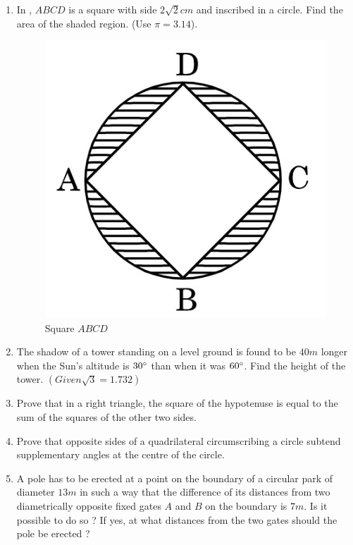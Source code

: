 \begin{enumerate}
\item In  , $ABCD$ is a square with side $2\sqrt{2}cm$ and inscribed in a circle. Find the area of the shaded region. (Use $\pi = 3.14$).
\begin{figure}[H]
    \centering
    \includegraphics[width=\columnwidth]{figs/img5.jpg}
    \caption{Square $ABCD$ }
    \label{fig:Figh_5}
\end{figure}

\item The shadow of a tower standing on a level ground is found to be $40 m$ longer when the Sun's altitude is $30\degree$ than when it was $60\degree$. Find the height of the tower. $(Given \sqrt{3} = 1.732)$

\item Prove that in a right triangle, the square of the hypotenuse is equal to the sum of the squares of the other two sides.

\item Prove that opposite sides of a quadrilateral circumscribing a circle subtend supplementary angles at the centre of the circle.

\item A pole has to be erected at a point on the boundary of a circular park of diameter $13 m$ in such a way that the difference of its distances from two
diametrically opposite fixed gates $A$ and $B$ on the boundary is $7 m$. Is it possible to do so ? If yes, at what distances from the two gates should the pole be erected ?


\end{enumerate}
